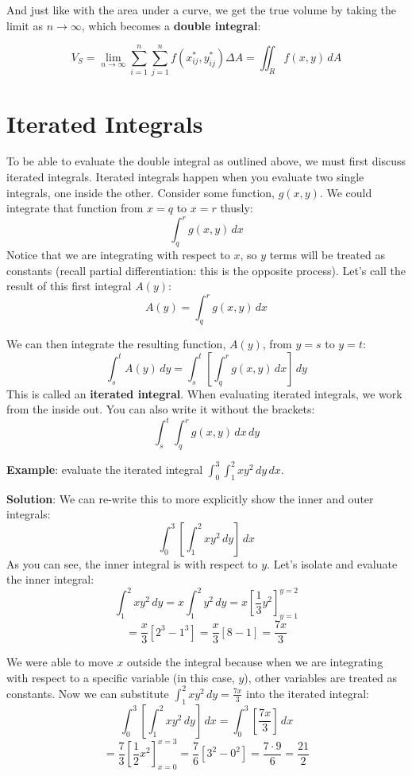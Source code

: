 And just like with the area under a curve, we get the true volume by taking the
limit as $n \to \infty$, which becomes a \textbf{double integral}:

\begin{mdframed}[style = important, frametitle = {Volume of a Solid over a 
Region}]
$$V_{\textit{S}} = \lim_{n \to \infty} \sum_{i = 1}^n \sum_{j = 1}^n f(x_{ij}^*
, y_{ij}^*) \Delta A = \iint_{\textit{R}} f(x, y)\,dA$$
\end{mdframed}


\section{Iterated Integrals}

To be able to evaluate the double integral as outlined above, we must first 
discuss iterated integrals. Iterated integrals happen when you evaluate two 
single integrals, one inside the other. Consider some function, $g(x, y)$. We 
could integrate that function from $x = q$ to $x = r$ thusly:
$$\int_q^r g(x, y)\,dx$$
Notice that we are integrating with respect to $x$, so $y$ terms will be 
treated as constants (recall partial differentiation: this is the opposite 
process). Let's call the result of this first integral $A(y)$:
$$A(y) = \int_q^r g(x, y)\,dx$$

We can then integrate the resulting function, $A(y)$, from $y = s$ to $y = t$:
$$\int_s^t A(y)\,dy = \int_s^t \left[ \int_q^r g(x, y)\,dx \right]\,dy$$
This is called an \textbf{iterated integral}. When 
evaluating iterated integrals, we work from the inside out. You can also write 
it without the brackets:
$$\int_s^t \int_q^r g(x, y)\,dx\,dy$$

\textbf{Example}: evaluate the iterated integral $\int_0^3 \int_1^2 x y^2\,dy
\,dx$.

\textbf{Solution}: We can re-write this to more explicitly show the inner and 
outer integrals:
$$\int_0^3 \left[ \int_1^2 x y^2\,dy \right]\,dx$$
As you can see, the inner integral is with respect to $y$. Let's isolate and 
evaluate the inner integral:
$$\int_1^2 x y^2\,dy = x \int_1^2 y^2\,dy = x \left[ \frac{1}{3}y^2 \right]_{y 
= 1}^{y = 2}$$
$$= \frac{x}{3} \left[ 2^3 - 1^3 \right] = \frac{x}{3} \left[ 8 - 1 \right] = 
\frac{7x}{3}$$

We were able to move $x$ outside the integral because when we are integrating 
with respect to a specific variable (in this case, $y$), other variables are 
treated as constants. Now we can substitute $\int_1^2 xy^2 \,dy = \frac{7x}{3}$
into the iterated integral:
$$\int_0^3 \left[ \int_1^2 x y^2\,dy \right]\,dx = \int_0^3 \left[ \frac{7x}{3}
\right]\,dx$$
$$= \frac{7}{3} \left[ \frac{1}{2}x^2 \right]_{x = 0}^{x = 3} = \frac{7}{6} 
\left[ 3^2 - 0^2 \right] = \frac{7 \cdot 9}{6} = \frac{21}{2}$$

